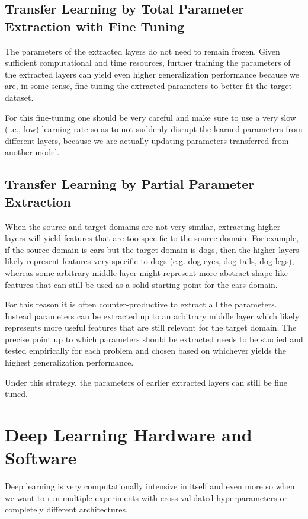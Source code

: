 \subsection{Transfer Learning by Total Parameter Extraction with Fine Tuning}

The parameters of the extracted layers do not need to remain frozen. Given sufficient computational and time resources, further training the parameters of the extracted layers can yield even higher generalization performance because we are, in some sense, fine-tuning the extracted parameters to better fit the target dataset.

For this fine-tuning one should be very careful and make sure to use a very slow (i.e., low) learning rate so as to not suddenly disrupt the learned parameters from different layers, because we are actually updating parameters transferred from another model.

\subsection{Transfer Learning by Partial Parameter Extraction}

When the source and target domains are not very similar, extracting higher layers will yield features that are too specific to the source domain. For example, if the source domain is cars but the target domain is dogs, then the higher layers likely represent features very specific to dogs (e.g. dog eyes, dog tails, dog legs), whereas some arbitrary middle layer might represent more abstract shape-like features that can still be used as a solid starting point for the cars domain.

For this reason it is often counter-productive to extract all the parameters. Instead parameters can be extracted up to an arbitrary middle layer which likely represents more useful features that are still relevant for the target domain. The precise point up to which parameters should be extracted needs to be studied and tested empirically for each problem and chosen based on whichever yields the highest generalization performance.

Under this strategy, the parameters of earlier extracted layers can still be fine tuned.

\section{Deep Learning Hardware and Software}

Deep learning is very computationally intensive in itself and even more so when we want to run multiple experiments with cross-validated hyperparameters or completely different architectures.

